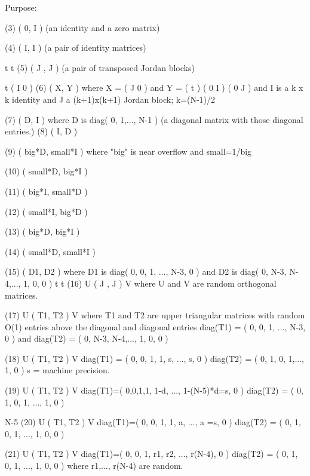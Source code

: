 \begin{DoxyParagraph}{Purpose\+: }
\begin{DoxyVerb}
 (3)  ( 0, I )         (an identity and a zero matrix)

 (4)  ( I, I )         (a pair of identity matrices)

         t   t
 (5)  ( J , J  )       (a pair of transposed Jordan blocks)

                                     t                ( I   0  )
 (6)  ( X, Y )         where  X = ( J   0  )  and Y = (      t )
                                  ( 0   I  )          ( 0   J  )
                       and I is a k x k identity and J a (k+1)x(k+1)
                       Jordan block; k=(N-1)/2

 (7)  ( D, I )         where D is diag( 0, 1,..., N-1 ) (a diagonal
                       matrix with those diagonal entries.)
 (8)  ( I, D )

 (9)  ( big*D, small*I ) where "big" is near overflow and small=1/big

 (10) ( small*D, big*I )

 (11) ( big*I, small*D )

 (12) ( small*I, big*D )

 (13) ( big*D, big*I )

 (14) ( small*D, small*I )

 (15) ( D1, D2 )        where D1 is diag( 0, 0, 1, ..., N-3, 0 ) and
                        D2 is diag( 0, N-3, N-4,..., 1, 0, 0 )
           t   t
 (16) U ( J , J ) V     where U and V are random orthogonal matrices.

 (17) U ( T1, T2 ) V    where T1 and T2 are upper triangular matrices
                        with random O(1) entries above the diagonal
                        and diagonal entries diag(T1) =
                        ( 0, 0, 1, ..., N-3, 0 ) and diag(T2) =
                        ( 0, N-3, N-4,..., 1, 0, 0 )

 (18) U ( T1, T2 ) V    diag(T1) = ( 0, 0, 1, 1, s, ..., s, 0 )
                        diag(T2) = ( 0, 1, 0, 1,..., 1, 0 )
                        s = machine precision.

 (19) U ( T1, T2 ) V    diag(T1)=( 0,0,1,1, 1-d, ..., 1-(N-5)*d=s, 0 )
                        diag(T2) = ( 0, 1, 0, 1, ..., 1, 0 )

                                                        N-5
 (20) U ( T1, T2 ) V    diag(T1)=( 0, 0, 1, 1, a, ..., a   =s, 0 )
                        diag(T2) = ( 0, 1, 0, 1, ..., 1, 0, 0 )

 (21) U ( T1, T2 ) V    diag(T1)=( 0, 0, 1, r1, r2, ..., r(N-4), 0 )
                        diag(T2) = ( 0, 1, 0, 1, ..., 1, 0, 0 )
                        where r1,..., r(N-4) are random.


\end{DoxyVerb}
\end{DoxyParagraph}
